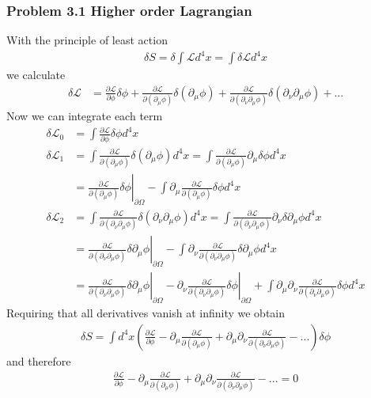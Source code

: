 \documentclass[10pt,a4paper]{book}
\theoremstyle{definition}
\begin{document}
\subsubsection{Problem 3.1 Higher order Lagrangian}
With the principle of least action
\begin{align}
\delta S=\delta\int\mathcal{L}d^4x=\int\delta\mathcal{L}d^4x
\end{align}
we calculate
\begin{align}
\delta\mathcal{L}
&=\frac{\partial \mathcal{L}}{\partial\phi}\delta\phi+
\frac{\partial \mathcal{L}}{\partial(\partial_\mu\phi)}\delta(\partial_\mu\phi)+
\frac{\partial \mathcal{L}}{\partial(\partial_\nu\partial_\mu\phi)}\delta(\partial_\nu\partial_\mu\phi)+...
\end{align}
Now we can integrate each term
\begin{align}
\delta\mathcal{L}_0&=\int \frac{\partial \mathcal{L}}{\partial\phi}\delta\phi d^4x\\
%
\delta\mathcal{L}_1&=\int \frac{\partial \mathcal{L}}{\partial(\partial_\mu\phi)}\delta(\partial_\mu\phi) d^4x
=\int \frac{\partial \mathcal{L}}{\partial(\partial_\mu\phi)}\partial_\mu\delta\phi d^4x\\
&=\left.\frac{\partial \mathcal{L}}{\partial(\partial_\mu\phi)}\delta\phi\right|_{\partial\Omega}-\int \partial_\mu\frac{\partial \mathcal{L}}{\partial(\partial_\mu\phi)}\delta\phi d^4x\\
%
\delta\mathcal{L}_2&=\int \frac{\partial \mathcal{L}}{\partial(\partial_\nu\partial_\mu\phi)}\delta(\partial_\nu\partial_\mu\phi) d^4x
=\int \frac{\partial \mathcal{L}}{\partial(\partial_\nu\partial_\mu\phi)}\partial_\nu\delta\partial_\mu\phi d^4x\\
&=\left.\frac{\partial \mathcal{L}}{\partial(\partial_\nu\partial_\mu\phi)}\delta\partial_\mu\phi\right|_{\partial\Omega}-\int \partial_\nu\frac{\partial \mathcal{L}}{\partial(\partial_\nu\partial_\mu\phi)}\delta\partial_\mu\phi d^4x\\
&=\left.\frac{\partial \mathcal{L}}{\partial(\partial_\nu\partial_\mu\phi)}\delta\partial_\mu\phi\right|_{\partial\Omega}-\left.\partial_\nu\frac{\partial \mathcal{L}}{\partial(\partial_\nu\partial_\mu\phi)}\delta\phi\right|_{\partial\Omega}+\int \partial_\mu\partial_\nu\frac{\partial \mathcal{L}}{\partial(\partial_\nu\partial_\mu\phi)}\delta\phi d^4x
\end{align}
Requiring that all derivatives vanish at infinity we obtain
\begin{align}
\delta S=\int d^4x\left(
\frac{\partial \mathcal{L}}{\partial\phi}
- \partial_\mu\frac{\partial \mathcal{L}}{\partial(\partial_\mu\phi)}
+\partial_\mu\partial_\nu\frac{\partial \mathcal{L}}{\partial(\partial_\nu\partial_\mu\phi)}-...
\right)\delta\phi
\end{align}
and therefore
\begin{align}
\frac{\partial \mathcal{L}}{\partial\phi}
- \partial_\mu\frac{\partial \mathcal{L}}{\partial(\partial_\mu\phi)}
+\partial_\mu\partial_\nu\frac{\partial \mathcal{L}}{\partial(\partial_\nu\partial_\mu\phi)}-...=0
\end{align}
\end{document}
